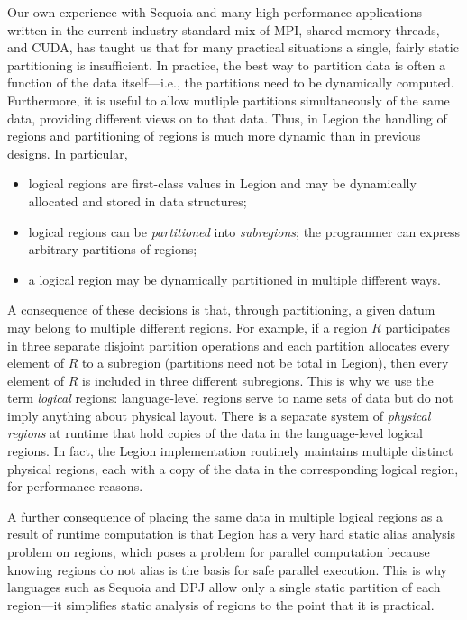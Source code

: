 Our own experience with Sequoia and many high-performance applications
written in the current industry standard mix of MPI, shared-memory
threads, and CUDA, has taught us that for many practical situations a
single, fairly static partitioning is insufficient.  In practice, the
best way to partition data is often a function of the data
itself---i.e., the partitions need to be dynamically computed.
Furthermore, it is useful to allow mutliple partitions simultaneously of
the same data, providing different views on to that data. Thus, in Legion the 
handling of regions and partitioning of regions is much more dynamic than in 
previous designs.  In particular,
\begin{itemize}
\item  logical regions are first-class values in Legion
and may be dynamically allocated and stored in data structures;

\item logical regions can be {\em partitioned} into {\em subregions}; the programmer can express arbitrary partitions of
regions;

\item  a logical region may be dynamically partitioned in multiple different ways.
\end{itemize}
A consequence of these decisions is that, through partitioning, a
given datum may belong to multiple different regions.  For example, if
a region $R$ participates in three separate disjoint partition
operations and each partition allocates every element of $R$ to a
subregion (partitions need not be total in Legion), then every element
of $R$ is included in three different subregions.  This is why we use
the term {\em logical} regions: language-level regions serve to name
sets of data but do not imply anything about physical layout.  There
is a separate system of {\em physical regions} at runtime that hold
copies of the data in the language-level logical regions.  In fact,
the Legion implementation routinely maintains multiple distinct
physical regions, each with a copy of the data in the corresponding
logical region, for performance reasons.

A further consequence of placing the same data in multiple logical
regions as a result of runtime computation is that Legion has a very
hard static alias analysis problem on regions, which poses a problem
for parallel computation because knowing regions do not alias is the
basis for safe parallel execution.  This is why languages such as
Sequoia and DPJ allow only a single static partition of each
region---it simplifies static analysis of regions to the point that it
is practical.  


